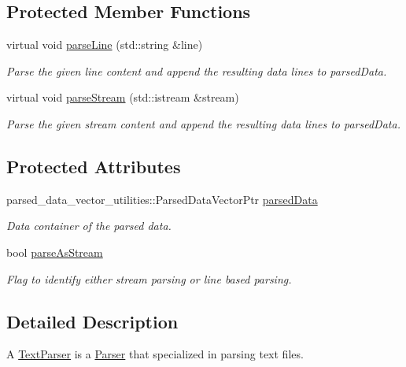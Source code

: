 \subsection*{Protected Member Functions}
\begin{DoxyCompactItemize}
\item 
virtual void \hyperlink{classtudat_1_1input__output_1_1TextParser_ac0e038fccafbb79ff2d8386f7521999c}{parse\+Line} (std\+::string \&line)
\begin{DoxyCompactList}\small\item\em Parse the given line content and append the resulting data lines to parsed\+Data. \end{DoxyCompactList}\item 
virtual void \hyperlink{classtudat_1_1input__output_1_1TextParser_accbecbef478769713a2729a4a123d75c}{parse\+Stream} (std\+::istream \&stream)
\begin{DoxyCompactList}\small\item\em Parse the given stream content and append the resulting data lines to parsed\+Data. \end{DoxyCompactList}\end{DoxyCompactItemize}
\subsection*{Protected Attributes}
\begin{DoxyCompactItemize}
\item 
parsed\+\_\+data\+\_\+vector\+\_\+utilities\+::\+Parsed\+Data\+Vector\+Ptr \hyperlink{classtudat_1_1input__output_1_1TextParser_aaae584bf29ac4466230bf18c976a28d7}{parsed\+Data}
\begin{DoxyCompactList}\small\item\em Data container of the parsed data. \end{DoxyCompactList}\item 
bool \hyperlink{classtudat_1_1input__output_1_1TextParser_a0523e93af363869e44119419880c41e4}{parse\+As\+Stream}
\begin{DoxyCompactList}\small\item\em Flag to identify either stream parsing or line based parsing. \end{DoxyCompactList}\end{DoxyCompactItemize}


\subsection{Detailed Description}
A \hyperlink{classtudat_1_1input__output_1_1TextParser}{Text\+Parser} is a \hyperlink{classtudat_1_1input__output_1_1Parser}{Parser} that specialized in parsing text files. 

